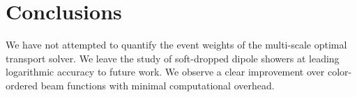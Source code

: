 \section{Conclusions}\label{sec:conclusions}

We have not attempted to quantify the event weights of the multi-scale
optimal transport solver. We leave the study of soft-dropped dipole
showers at leading logarithmic accuracy to future work. We observe a
clear improvement over color-ordered beam functions with minimal
computational overhead.


